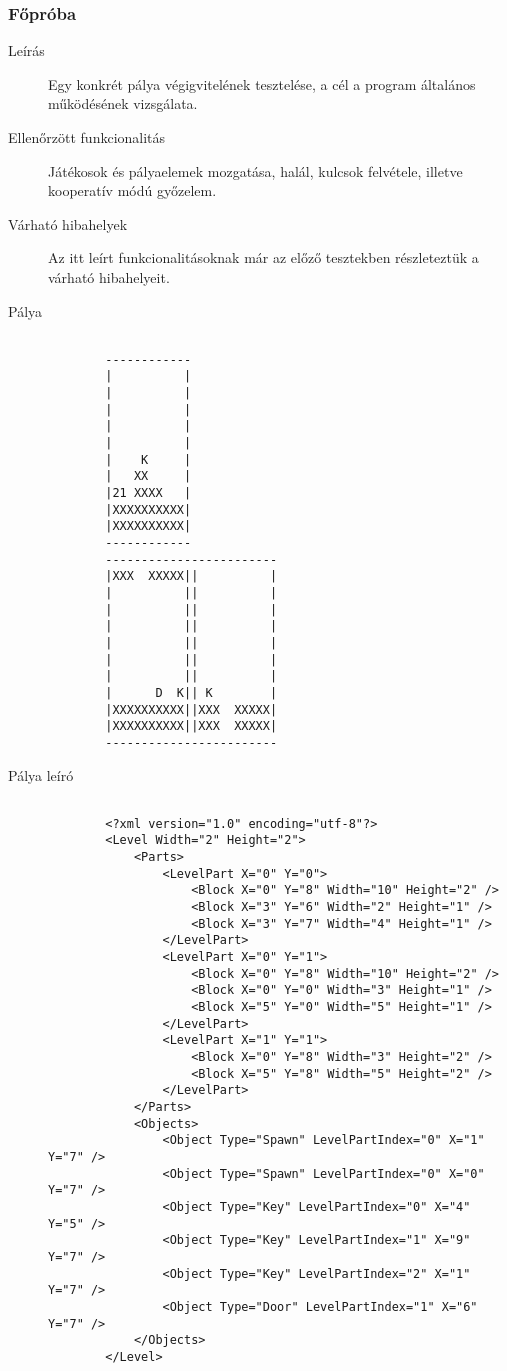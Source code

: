 \subsubsection{Főpróba}
\begin{description}
	
	\item[Leírás] Egy konkrét pálya végigvitelének tesztelése, a cél a program általános működésének vizsgálata.
	
	\item[Ellenőrzött funkcionalitás] Játékosok és pályaelemek mozgatása, halál, kulcsok felvétele, illetve kooperatív módú győzelem.
	
	\item[Várható hibahelyek] Az itt leírt funkcionalitásoknak már az előző tesztekben részleteztük a várható hibahelyeit.

	\item[Pálya]
	\begin{verbatim}
	
		------------
		|          |
		|          |
		|          |
		|          |
		|          |
		|    K     |
		|   XX     |
		|21 XXXX   |
		|XXXXXXXXXX|
		|XXXXXXXXXX|
		------------
		------------------------
		|XXX  XXXXX||          |
		|          ||          |
		|          ||          |
		|          ||          |
		|          ||          |
		|          ||          |
		|          ||          |
		|      D  K|| K        |
		|XXXXXXXXXX||XXX  XXXXX|
		|XXXXXXXXXX||XXX  XXXXX|
		------------------------
	\end{verbatim}

	\item[Pálya leíró]
	\begin{verbatim}
	
		<?xml version="1.0" encoding="utf-8"?>
		<Level Width="2" Height="2">
		    <Parts>
		        <LevelPart X="0" Y="0">
		            <Block X="0" Y="8" Width="10" Height="2" />
		            <Block X="3" Y="6" Width="2" Height="1" />
		            <Block X="3" Y="7" Width="4" Height="1" />
		        </LevelPart>
		        <LevelPart X="0" Y="1">
		            <Block X="0" Y="8" Width="10" Height="2" />
		            <Block X="0" Y="0" Width="3" Height="1" />
		            <Block X="5" Y="0" Width="5" Height="1" />
		        </LevelPart>
		        <LevelPart X="1" Y="1">
		            <Block X="0" Y="8" Width="3" Height="2" />
		            <Block X="5" Y="8" Width="5" Height="2" />
		        </LevelPart>
		    </Parts>
		    <Objects>
		        <Object Type="Spawn" LevelPartIndex="0" X="1" Y="7" />
		        <Object Type="Spawn" LevelPartIndex="0" X="0" Y="7" />
		        <Object Type="Key" LevelPartIndex="0" X="4" Y="5" />
		        <Object Type="Key" LevelPartIndex="1" X="9" Y="7" />
		        <Object Type="Key" LevelPartIndex="2" X="1" Y="7" />
		        <Object Type="Door" LevelPartIndex="1" X="6" Y="7" />
		    </Objects>
		</Level>
	\end{verbatim}
	

\end{description}
